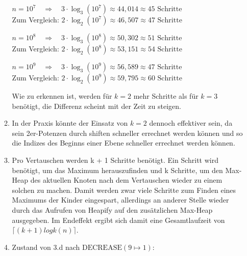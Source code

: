 \documentclass{article}
\begin{document}
\begin{enumerate}[\bfseries1.]
\begin{enumerate}
                $n = 10^7 \quad \Rightarrow \quad 3 \cdot \log_3(10^7) \approx
                44,014 \approx 45 \text{ Schritte} $
                \\ Zum Vergleich: $2 \cdot \log_2(10^7) \approx 46,507 \approx
                47 \text{ Schritte}$
                
                $n = 10^8 \quad \Rightarrow \quad 3 \cdot \log_3(10^8) \approx
                50,302 \approx 51 \text{ Schritte} $
                \\ Zum Vergleich: $2 \cdot \log_2(10^8) \approx 53,151 \approx
                54 \text{ Schritte}$
                
                $n = 10^9 \quad \Rightarrow \quad 3 \cdot \log_3(10^9) \approx
                56,589 \approx 47 \text{ Schritte} $
                \\ Zum Vergleich: $2 \cdot \log_2(10^9) \approx 59,795 \approx
                60 \text{ Schritte}$
                
                Wie zu erkennen ist, werden für $k=2$ mehr Schritte als für
                $k=3$ benötigt, die Differenz scheint mit der Zeit zu steigen.
            
            \item
                In der Praxis könnte der Einsatz von $k=2$ dennoch effektiver
                sein, da sein 2er-Potenzen durch shiften schneller errechnet
                werden können und so die Indizes des Beginns einer Ebene
                schneller errechnet werden können.
                
            \item
                Pro Vertauschen werden k + 1 Schritte benötigt. Ein Schritt wird benötigt, um das Maximum herauszufinden und k Schritte, um den Max-Heap des aktuellen Knoten nach dem Vertauschen wieder zu einem solchen zu machen. Damit werden zwar viele Schritte zum Finden eines Maximums der Kinder eingespart, allerdings an anderer Stelle wieder durch das Aufrufen von Heapify auf den zusätzlichen Max-Heap ausgegeben. Im Endeffekt ergibt sich damit eine Gesamtlaufzeit von $\lceil (k + 1) log k (n) \rceil$.
            \item
                Zustand von 3.d nach $\text{DECREASE}(9 \mapsto 1)$:
                
                

\end{enumerate}
\end{enumerate}
\end{document}
